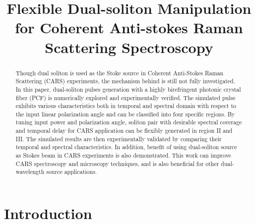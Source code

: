 \documentclass{osa-article}
\begin{document}
\title{Flexible Dual-soliton Manipulation for Coherent Anti-stokes Raman Scattering Spectroscopy}





\begin{abstract}
Though dual soliton is used as the Stoke source in Coherent Anti-Stokes Raman Scattering (CARS) experiments, the mechanism behind is still not fully investigated. In this paper, dual-soliton pulses generation with a highly birefringent photonic crystal fiber (PCF) is numerically explored and experimentally verified. The simulated pulse exhibits various characteristics both in temporal and spectral domain with respect to the input linear polarization angle and can be classified into four specific regions. By tuning input power and polarization angle, soliton pair with desirable spectral coverage and temporal delay for CARS application can be flexibly generated in region II and III. The simulated results are then experimentally validated by comparing their temporal and spectral characteristics. In addition, benefit of using dual-soliton source as Stokes beam in CARS experiments is also demonstrated. This work can improve CARS spectroscopy and microscopy techniques, and is also beneficial for other dual-wavelength source applications.
\end{abstract}


\section{Introduction}
\end{document}
